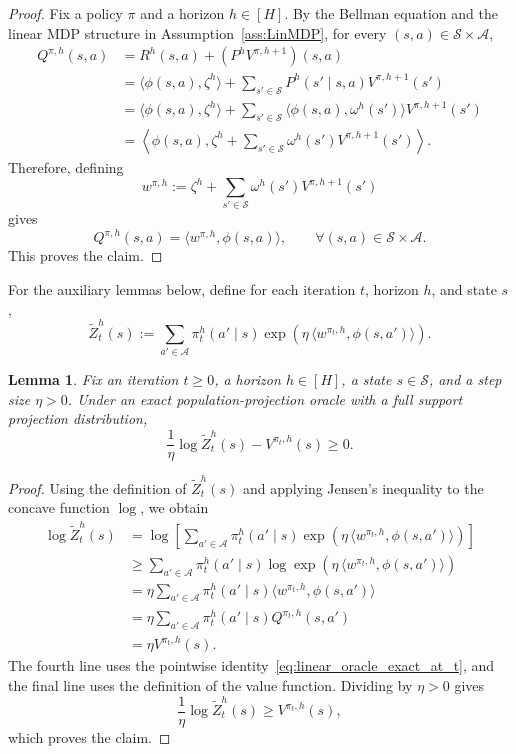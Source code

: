 \documentclass[11pt]{article}
\newtheorem{lem}{Lemma}
\begin{document}
\begin{proof}
Fix a policy $\pi$ and a horizon $h\in[H]$. By the Bellman equation and the linear MDP
structure in Assumption~\ref{ass:LinMDP}, for every $(s,a)\in\mathcal S\times\mathcal A$,
\begin{align*}
Q^{\pi,h}(s,a)
&=
R^h(s,a)
+
(P^h V^{\pi,h+1})(s,a) \\
&=
\langle \phi(s,a),\zeta^h\rangle
+
\sum_{s'\in\mathcal S}
P^h(s'\mid s,a)V^{\pi,h+1}(s') \\
&=
\langle \phi(s,a),\zeta^h\rangle
+
\sum_{s'\in\mathcal S}
\langle \phi(s,a),\omega^h(s')\rangle
V^{\pi,h+1}(s') \\
&=
\left\langle
\phi(s,a),
\zeta^h+\sum_{s'\in\mathcal S}\omega^h(s')V^{\pi,h+1}(s')
\right\rangle .
\end{align*}
Therefore, defining
\[
w^{\pi,h}
:=
\zeta^h+\sum_{s'\in\mathcal S}\omega^h(s')V^{\pi,h+1}(s')
\]
gives
\[
Q^{\pi,h}(s,a)
=
\langle w^{\pi,h},\phi(s,a)\rangle,
\qquad
\forall (s,a)\in\mathcal S\times\mathcal A .
\]
This proves the claim.
\end{proof}

For the auxiliary lemmas below, define for each iteration $t$, horizon $h$, and state $s$,
\[
\widetilde Z_t^h(s)
:=
\sum_{a'\in\mathcal A}
\pi_t^h(a'\mid s)
\exp\!\left(
\eta\,\langle w^{\pi_t,h},\phi(s,a')\rangle
\right).
\]
\begin{lem}\label{lemma:logZilin}
Fix an iteration $t\ge0$, a horizon $h\in[H]$, a state $s\in\mathcal S$, and a step size
$\eta>0$. Under an exact population-projection oracle with a full support projection distribution,
\[
\frac{1}{\eta}\log \widetilde Z_t^h(s)-V^{\pi_t,h}(s)\ge0.
\]
\end{lem}

\begin{proof}
Using the definition of $\widetilde Z_t^h(s)$ and applying Jensen's inequality to the concave
function $\log$, we obtain
\begin{align*}
\log \widetilde Z_t^h(s)
&=
\log\!\left[
\sum_{a'\in\mathcal A}
\pi_t^h(a'\mid s)
\exp\!\left(
\eta\,\langle w^{\pi_t,h},\phi(s,a')\rangle
\right)
\right] \\
&\ge
\sum_{a'\in\mathcal A}
\pi_t^h(a'\mid s)
\log
\exp\!\left(
\eta\,\langle w^{\pi_t,h},\phi(s,a')\rangle
\right) \\
&=
\eta
\sum_{a'\in\mathcal A}
\pi_t^h(a'\mid s)
\langle w^{\pi_t,h},\phi(s,a')\rangle \\
&=
\eta
\sum_{a'\in\mathcal A}
\pi_t^h(a'\mid s)
Q^{\pi_t,h}(s,a') \\
&=
\eta V^{\pi_t,h}(s).
\end{align*}
The fourth line uses the pointwise identity~\eqref{eq:linear_oracle_exact_at_t}, and the final line uses
the definition of the value function. Dividing by $\eta>0$ gives
\[
\frac{1}{\eta}\log \widetilde Z_t^h(s)\ge V^{\pi_t,h}(s),
\]
which proves the claim.
\end{proof}
\end{document}
